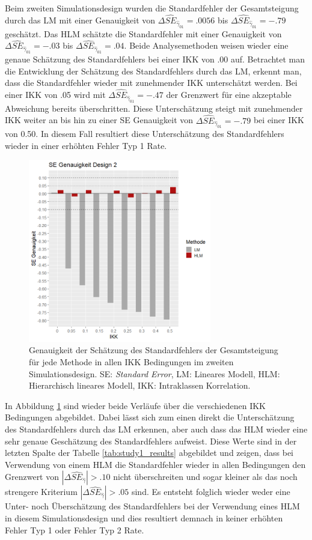 \documentclass[12pt, a4paper]{article}\usepackage[]{graphicx}\usepackage[]{color}
\begin{document}
Beim zweiten Simulationsdesign wurden die Standardfehler der Gesamtsteigung durch das LM mit einer Genauigkeit von $\Delta\widehat{SE}_{\widehat{\gamma}_{01}} = .0056$ bis $\Delta\widehat{SE}_{\widehat{\gamma}_{01}} = -.79$ geschätzt. Das HLM schätzte die Standardfehler mit einer Genauigkeit von $\Delta\widehat{SE}_{\widehat{\gamma}_{01}} = -.03$ bis $\Delta\widehat{SE}_{\widehat{\gamma}_{01}} = .04$. Beide Analysemethoden weisen wieder eine genaue Schätzung des Standardfehlers bei einer IKK von .00 auf. Betrachtet man die Entwicklung der Schätzung des Standardfehlers durch das LM, erkennt man, dass die Standardfehler wieder mit zunehmender IKK unterschätzt werden. Bei einer IKK von .05 wird mit $\Delta\widehat{SE}_{\widehat{\gamma}_{01}} = -.47$ der Grenzwert für eine akzeptable Abweichung bereits überschritten. Diese Unterschätzung steigt mit zunehmender IKK weiter an bis hin zu einer SE Genauigkeit von $\Delta\widehat{SE}_{\widehat{\gamma}_{01}} = -.79$ bei einer IKK von 0.50. In diesem Fall resultiert diese Unterschätzung des Standardfehlers wieder in einer erhöhten Fehler Typ 1 Rate.
\begin{figure}[t!]
\centering
\captionsetup{width=8cm}
\includegraphics[width=8cm, height=8cm]{./figures/se_genauigkeit_design2}
\caption{Genauigkeit der Schätzung des Standardfehlers der Gesamtsteigung für jede Methode in allen IKK Bedingungen im zweiten Simulationsdesign. SE: \textit{Standard Error}, LM: Lineares Modell, HLM: Hierarchisch lineares Modell, IKK: Intraklassen Korrelation.}
\label{fig:se_genauigkeit_design2}
\end{figure}
In Abbildung \ref{fig:se_genauigkeit_design2} sind wieder beide Verläufe über die verschiedenen IKK Bedingungen abgebildet. Dabei lässt sich zum einen direkt die Unterschätzung des Standardfehlers durch das LM erkennen, aber auch dass das HLM wieder eine sehr genaue Geschätzung des Standardfehlers aufweist. Diese Werte sind in der letzten Spalte der Tabelle \ref{tab:study1_results} abgebildet und zeigen, dass bei Verwendung von einem HLM die Standardfehler wieder in allen Bedingungen den Grenzwert von $|\Delta\widehat{SE}_{\widehat{\gamma}}| > .10$ nicht überschreiten und sogar kleiner als das noch strengere Kriterium $|\Delta\widehat{SE}_{\widehat{\gamma}}| > .05$ sind. Es entsteht folglich wieder weder eine Unter- noch Überschätzung des Standardfehlers bei der Verwendung eines HLM in diesem Simulationsdesign und dies resultiert demnach in keiner erhöhten Fehler Typ 1 oder Fehler Typ 2 Rate.
\end{document}
